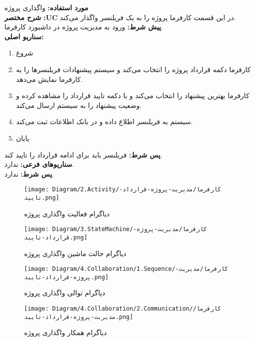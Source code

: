 \textbf{مورد استفاده:}
واگذاری پروژه
\\
\textbf{شرح مختصر :UC}
در این قسمت کارفرما پروژه را به یک فریلنسر واگذار می‌کند.
\\
\textbf{پيش شرط:}
ورود به مدیریت پروژه در داشبورد کارفرما.
\\
\textbf{سناريو اصلی:}
\begin{enumerate}
\item
شروع
\item
کارفرما دکمه قرارداد پروژه را انتخاب می‌کند و سیستم پیشنهادات فریلنسرها را به کارفرما نمایش می‌دهد.
\item
کارفرما بهترین پیشنهاد را انتخاب می‌کند و با دکمه تایید قرارداد را مشاهده کرده و وضعیت پیشنهاد را به سیستم ارسال می‌کند.
\item
سیستم به فریلنسر اطلاع داده و در بانک اطلاعات ثبت می‌کند.
\item
پایان
\end{enumerate}

\noindent
\textbf{پس شرط:}
فریلنسر باید برای ادامه قرارداد را تایید کند.
\\
\textbf{سناريوهای فرعی:}
ندارد.
\\
\textbf{پس شرط:}
ندارد.



\begin{figure}[H]
	\centering
	\texttt{[image: Diagram/2.Activity/کارفرما/مدیریت-پروژه-قرارداد-تایید.png]}
	\caption{دیاگرام فعالیت واگذاری پروژه}
	\label{fig:a:واگذاری-پروژه}
\end{figure}
\begin{figure}[H]
	\centering
	\texttt{[image: Diagram/3.StateMachine/کارفرما/مدیریت-پروژه-قرارداد-تایید.png]}
	\caption{دیاگرام حالت ماشین واگذاری پروژه}
	\label{fig:sm:واگذاری-پروژه}
\end{figure}
\begin{figure}[H]
	\centering
	\texttt{[image: Diagram/4.Collaboration/1.Sequence/کارفرما/مدیریت-پروژه-قرارداد-تایید.png]}
	\caption{دیاگرام توالی واگذاری پروژه}
	\label{fig:s:واگذاری-پروژه}
\end{figure}
\begin{figure}[H]
	\centering
	\texttt{[image: Diagram/4.Collaboration/2.Communication/کارفرما/مدیریت-پروژه-قرارداد-تایید.png]}
	\caption{دیاگرام همکار واگذاری پروژه}
	\label{fig:c:واگذاری-پروژه}
\end{figure}
